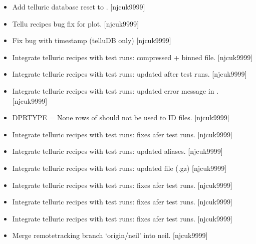 \documentclass[a4paper,10pt,english]{report}
\begin{document}
\label{\detokenize{misc/changelog:id407}}\begin{itemize}
\item {} 
Add telluric database reset to . {[}njcuk9999{]}

\item {} 
Tellu recipes \sphinxhyphen{} bug fix for plot. {[}njcuk9999{]}

\item {} 
Fix bug with timestamp (telluDB only) {[}njcuk9999{]}

\item {} 
Integrate telluric recipes with test runs: compressed + binned
 file. {[}njcuk9999{]}

\item {} 
Integrate telluric recipes with test runs: updated after test runs.
{[}njcuk9999{]}

\item {} 
Integrate telluric recipes with test runs: updated error message in
. {[}njcuk9999{]}

\item {} 
 \sphinxhyphen{} DPRTYPE = None  rows of  should not be
used to ID files. {[}njcuk9999{]}

\item {} 
Integrate telluric recipes with test runs: fixes afer test runs.
{[}njcuk9999{]}

\item {} 
Integrate telluric recipes with test runs: updated aliases.
{[}njcuk9999{]}

\item {} 
Integrate telluric recipes with test runs: updated  file
(.gz) {[}njcuk9999{]}

\item {} 
Integrate telluric recipes with test runs: fixes afer test runs.
{[}njcuk9999{]}

\item {} 
Integrate telluric recipes with test runs: fixes afer test runs.
{[}njcuk9999{]}

\item {} 
Integrate telluric recipes with test runs: fixes afer test runs.
{[}njcuk9999{]}

\item {} 
Merge remote\sphinxhyphen{}tracking branch ‘origin/neil’ into neil. {[}njcuk9999{]}

\end{itemize}
\end{document}
